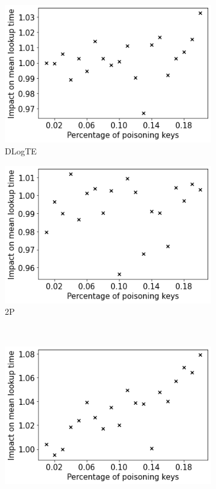 \documentclass[sigconf]{acmart}
\begin{document}
\begin{figure}[h]
\begin{subfigure}[b]{0.24\textwidth}
        \includegraphics[width=\textwidth]{figures/learned_indexes-mean_lookup_time-deterioration_dlogte.png}
        \caption{DLogTE}
    \end{subfigure}
    \hfill
    \begin{subfigure}[b]{0.24\textwidth}
        \centering
        \includegraphics[width=\textwidth]{figures/learned_indexes-mean_lookup_time-deterioration_2p.png}
        \caption{2P}
    \end{subfigure}
    \\
        \begin{subfigure}[b]{0.24\textwidth}
        \centering
        \includegraphics[width=\textwidth]{figures/learned_indexes-mean_lookup_time-deterioration_theilsen.png}

\end{subfigure}
\end{figure}
\end{document}
